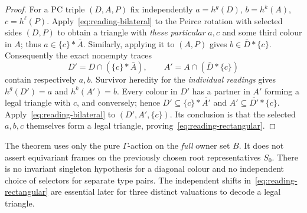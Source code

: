 \begin{proof}
For a PC triple $(D,A,P)$ fix independently
$a=h^g(D)$, $b=h^k(A)$, $c=h^\ell(P)$.
Apply~\eqref{eq:reading-bilateral} to the Peirce rotation
with selected sides $(D,P)$ to obtain a triangle with \emph{these
particular} $a,c$ and some third colour in $A$; thus
$a\in\{c\}*\bar A$.  Similarly, applying it to $(A,P)$
gives $b\in\bar D*\{c\}$.
Consequently the exact nonempty traces
\[
 D'=D\cap(\{c\}*\bar A),\qquad
 A'=A\cap(\bar D*\{c\})
\]
contain respectively $a,b$.  Survivor heredity for the
\emph{individual readings} gives $h^g(D')=a$ and
$h^k(A')=b$.  Every colour in $D'$ has a partner in $A'$
forming a legal triangle with $c$, and conversely; hence
$D'\subseteq\{c\}*\overline{A'}$ and
$A'\subseteq\overline{D'}*\{c\}$.
Apply~\eqref{eq:reading-bilateral} to $(D',A',\{c\})$.
Its conclusion is that the selected $a,b,c$ themselves form a
legal triangle, proving~\eqref{eq:reading-rectangular}.
\end{proof}

\begin{remark}
The theorem uses only the pure $\Gamma$-action on the \emph{full}
owner set $B$.  It does not assert equivariant frames on the
previously chosen root representatives $S_0$.  There is no
invariant singleton hypothesis for a diagonal colour and no
independent choice of selectors for separate type pairs.
The independent shifts in~\eqref{eq:reading-rectangular} are
essential later for three distinct valuations to decode a legal
triangle.
\end{remark}
